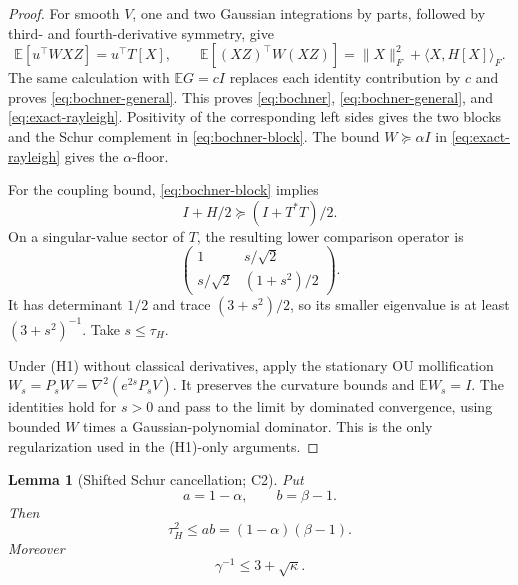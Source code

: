 \documentclass[11pt]{article}
\numberwithin{equation}{section}
\newtheorem{lemma}[theorem]{Lemma}
\newcommand{\E}{\mathbb E}
\begin{document}
\begin{proof}
For smooth $V$, one and two Gaussian integrations by parts, followed by
third- and fourth-derivative symmetry, give
\[
 \E[u^\top W XZ]=u^\top T[X],
 \qquad
 \E[(XZ)^\top W(XZ)]
 =\|X\|_F^2+\langle X,H[X]\rangle_F.
\]
The same calculation with $\E G=cI$ replaces each identity contribution by
$c$ and proves \eqref{eq:bochner-general}.  This proves
\eqref{eq:bochner}, \eqref{eq:bochner-general}, and
\eqref{eq:exact-rayleigh}.  Positivity of the corresponding left sides gives
the two blocks and the Schur complement in \eqref{eq:bochner-block}.
The bound $W\succeq\alpha I$ in \eqref{eq:exact-rayleigh} gives the
$\alpha$-floor.

For the coupling bound, \eqref{eq:bochner-block} implies
\[
 I+H/2\succeq (I+T^*T)/2.
\]
On a singular-value sector of $T$, the resulting lower comparison operator
is
\[
 \begin{pmatrix}1&s/\sqrt2\\s/\sqrt2&(1+s^2)/2\end{pmatrix}.
\]
It has determinant $1/2$ and trace $(3+s^2)/2$, so its smaller eigenvalue
is at least $(3+s^2)^{-1}$.  Take $s\le\tau_H$.

Under (H1) without classical derivatives, apply the stationary OU
mollification $W_s=P_sW=\nabla^2(e^{2s}P_sV)$.  It preserves the curvature
bounds and $\E W_s=I$.  The identities hold for $s>0$ and pass to the limit
by dominated convergence, using bounded $W$ times a Gaussian-polynomial
dominator.  This is the only regularization used in the
(H1)-only arguments.
\end{proof}

\begin{lemma}[Shifted Schur cancellation; C2]\label{lem:shifted-schur}
Put
\begin{equation}\label{eq:a-b}
 a=1-\alpha,\qquad b=\beta-1.
\end{equation}
Then
\begin{equation}\label{eq:ab}
 \tau_H^2\le ab=(1-\alpha)(\beta-1).
\end{equation}
Moreover
\begin{equation}\label{eq:sqrt-kappa-gap}
 \gamma^{-1}\le 3+\sqrt\kappa.
\end{equation}
\end{lemma}
\end{document}
